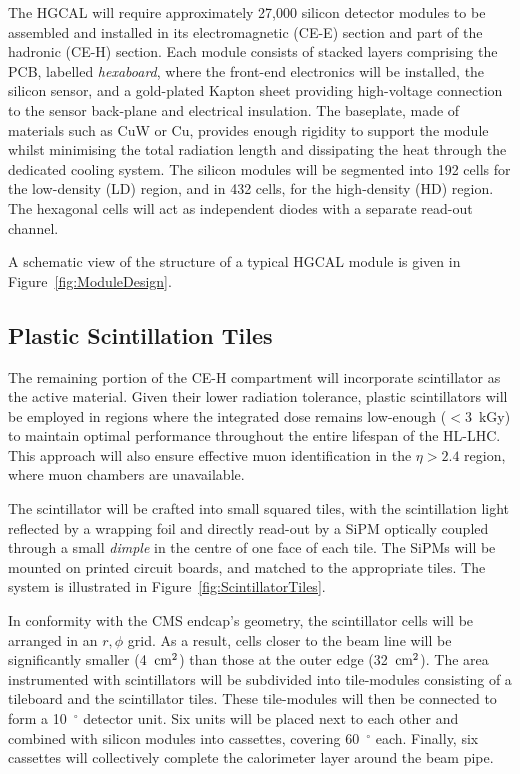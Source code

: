\bigbreak

The HGCAL will require approximately 27,000 silicon detector modules to be assembled and installed in its electromagnetic (CE-E) section and part of the hadronic (CE-H) section.
Each module consists of stacked layers comprising the PCB, labelled \textit{hexaboard}, where the front-end electronics will be installed, the silicon sensor, and a gold-plated Kapton sheet providing high-voltage connection to the sensor back-plane and electrical insulation. The baseplate, made of materials such as CuW or Cu, provides enough rigidity to support the module whilst minimising the total radiation length and dissipating the heat through the dedicated cooling system.
The silicon modules will be segmented into 192 cells for the low-density (LD) region, and in 432 cells, for the high-density (HD) region. The hexagonal cells will act as independent diodes with a separate read-out channel.

A schematic view of the structure of a typical HGCAL module is given in Figure~\ref{fig:ModuleDesign}.

\subsection{Plastic Scintillation Tiles}
\label{sec:Plastic Scintillation Tiles}

The remaining portion of the CE-H compartment will incorporate scintillator as the active material. Given their lower radiation tolerance, plastic scintillators will be employed in regions where the integrated dose remains low-enough ($<3$~kGy) to maintain optimal performance throughout the entire lifespan of the HL-LHC. 
This approach will also ensure effective muon identification in the $\eta>2.4$ region, where muon chambers are unavailable.

The scintillator will be crafted into small squared tiles, with the scintillation light reflected by a wrapping foil and directly read-out by a SiPM optically coupled through a small \textit{dimple} in the centre of one face of each tile. The SiPMs will be mounted on printed circuit boards, and matched to the appropriate tiles. 
The system is illustrated in Figure~\ref{fig:ScintillatorTiles}.

In conformity with the CMS endcap's geometry, the scintillator cells will be arranged in an $r,\phi$ grid. As a result, cells closer to the beam line will be significantly smaller (4~$\textnormal{cm}^2$) than those at the outer edge (32~$\textnormal{cm}^2$). 
The area instrumented with scintillators will be subdivided into tile-modules consisting of a tileboard and the scintillator tiles. These tile-modules will then be connected to form a 10~$^{\circ}$ detector unit. Six units will be placed next to each other and combined with silicon modules into cassettes, covering 60~$^{\circ}$ each. Finally, six cassettes will collectively complete the calorimeter layer around the beam pipe.

